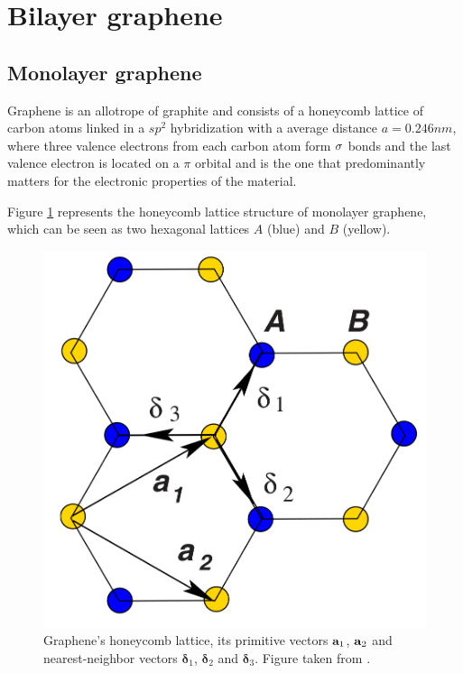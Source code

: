 \documentclass[12pt]{report}
\begin{document}
\section{Bilayer graphene} \label{sec:tbg}

\subsection{Monolayer graphene} \label{sec:monolayer}

Graphene is an allotrope of graphite and consists of a honeycomb lattice of carbon atoms linked in a $sp^2$ hybridization with a average distance $a = 0.246 \unit{nm}$, where three valence electrons from each carbon atom form ${\sigma}$ bonds and the last valence electron is located on a $\pi$ orbital and is the one that predominantly matters for the electronic properties of the material.

Figure \ref{fig:graphene-lattice_vectors} represents the honeycomb lattice structure of monolayer graphene, which can be seen as two hexagonal lattices $A$ (blue) and $B$ (yellow).

\begin{figure}[H]
\centering
\includegraphics[width=0.4\linewidth]{fig/tbg/graphene-lattice_vectors.png}
\caption{Graphene's honeycomb lattice, its primitive vectors $\vb{a}_1$, $\vb{a}_2$ and nearest-neighbor vectors $\bm{\delta}_1$, $\bm{\delta}_2$ and $\bm{\delta}_3$. Figure taken from \cite{geim2009}.}
\label{fig:graphene-lattice_vectors}
\end{figure}
\end{document}
